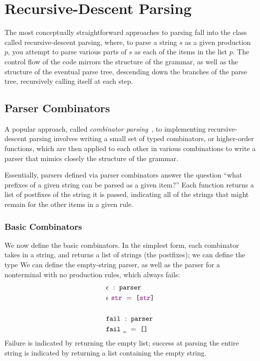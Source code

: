   \section{Recursive-Descent Parsing}
    The most conceptually straightforward approaches to parsing fall into the class called recursive-descent parsing, where, to parse a string $s$ as a given production $p$, you attempt to parse various parts of $s$ as each of the items in the list $p$.  The control flow of the code mirrors the structure of the grammar, as well as the structure of the eventual parse tree, descending down the branches of the parse tree, recursively calling itself at each step.
    
    \subsection{Parser Combinators}
      A popular approach, called \emph{combinator parsing}~\cite{pcomb}, to implementing recursive-descent parsing involves writing a small set of typed combinators, or higher-order functions, which are then applied to each other in various combinations to write a parser that mimics closely the structure of the grammar.
      
      Essentially, parsers defined via parser combinators answer the question ``what prefixes of a given string can be parsed as a given item?''  Each function returns a list of postfixes of the string it is passed, indicating all of the strings that might remain for the other items in a given rule.  
      
    \subsubsection{Basic Combinators}
      We now define the basic combinators.  In the simplest form, each combinator takes in a string, and returns a list of strings (the postfixes); we can define the type
     We can define the empty-string parser, as well as the parser for a nonterminal with no production rules, which always fails:
\begin{align*}
&\epsilon~:~\texttt{parser}\\
&\epsilon~\textcolor{violet}{\texttt{str}}~=~\texttt{[}\textcolor{violet}{\texttt{str}}\texttt{]} \\ \\
&\texttt{fail}~:~\texttt{parser}\\
&\texttt{fail}~\texttt{\_}~=~\texttt{[]}
\end{align*}
      Failure is indicated by returning the empty list; success at parsing the entire string is indicated by returning a list containing the empty string.
      
